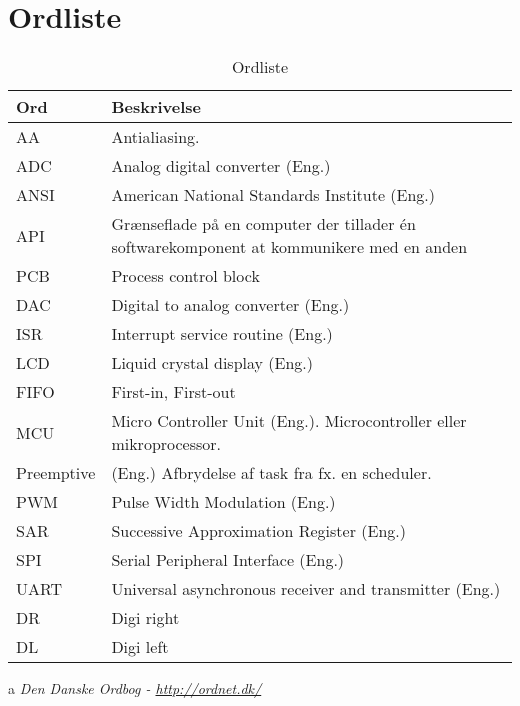\chapter{Ordliste} \label{bilag:ordliste}

\begin{table}[h!]
	\caption{Ordliste}
	\label{tab:ordliste}
	\begin{threeparttable}
		\begin{tabular}{l p{}}
			\toprule
			\textbf{Ord}      & \textbf{Beskrivelse}   \\ 
			\midrule
			AA			& Antialiasing.\\
			ADC			& Analog digital converter (Eng.)\\
			ANSI		& American National Standards Institute (Eng.)\\
			API			& Grænseflade på en computer der tillader én softwarekomponent at kommunikere med en anden\tnote{a}\\
			PCB			& Process control block\\
			DAC			& Digital to analog converter (Eng.)\\
			ISR			 & Interrupt service routine (Eng.) \\
			LCD			& Liquid crystal display (Eng.) \\
			FIFO		& First-in, First-out\\
			MCU       	& Micro Controller Unit (Eng.). Microcontroller eller mikroprocessor. \\
			Preemptive	& (Eng.) Afbrydelse af task fra fx. en scheduler.\\
			PWM			& Pulse Width Modulation (Eng.) \\
			SAR			& Successive Approximation Register (Eng.)\\
			SPI			& Serial Peripheral Interface (Eng.)  \\
			UART		& Universal asynchronous receiver and transmitter (Eng.)\\
			DR & Digi right\\
			DL & Digi left\\
			\bottomrule
		\end{tabular}
	
		\begin{tablenotes}
			\item[a] \textit{Den Danske Ordbog - \url{http://ordnet.dk/}}
		\end{tablenotes}
	\end{threeparttable}
\end{table}
